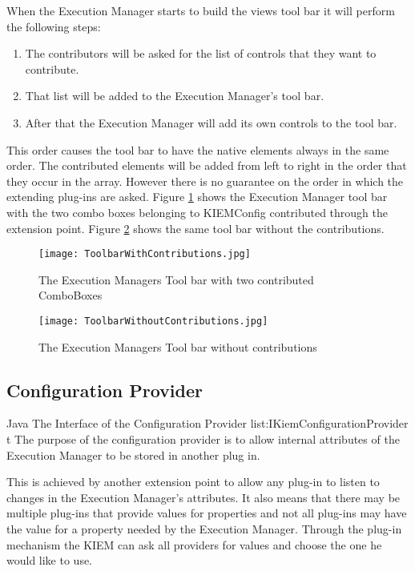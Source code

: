 When the Execution Manager starts to build the views tool bar it will perform the following steps:
\begin{enumerate}
 \item The contributors will be asked for the list of controls that they want to contribute.
 \item That list will be added to the Execution Manager's tool bar.
 \item After that the Execution Manager will add its own controls to the tool bar.
\end{enumerate}
This order causes the tool bar to have the native elements always in the same order.
The contributed elements will be added from left to right in the order that they occur in the array. However there
is no guarantee on the order in which the extending plug-ins are asked.
Figure \ref{fig:ToolbarWithContributions} shows the Execution Manager tool bar with the two combo boxes belonging to \ac{KIEMConfig}
contributed through the extension point. Figure \ref{fig:ToolbarWithoutContributions} shows the same tool bar without
the contributions.
\begin{figure}[H]
  \centering
  \texttt{[image: ToolbarWithContributions.jpg]}
  \caption[The Execution Managers Tool bar with two contributed ComboBoxes]%
  {The Execution Managers Tool bar with two contributed ComboBoxes\protect}
  \label{fig:ToolbarWithContributions}
\end{figure}
\begin{figure}[H]
  \centering
  \texttt{[image: ToolbarWithoutContributions.jpg]}
  \caption[The Execution Managers Tool bar without contributions]%
  {The Execution Managers Tool bar without contributions\protect}
  \label{fig:ToolbarWithoutContributions}
\end{figure}

\subsection{Configuration Provider}
\label{section:ConfigurationProvider}
\listingjava
{}
{Java}
{The Interface of the Configuration Provider}
{list:IKiemConfigurationProvider}
{t}
The purpose of the configuration provider is to allow internal attributes of the
Execution Manager to be stored in another plug in. 

This is achieved by another extension point to allow any plug-in to listen to changes
in the Execution Manager's attributes. It also means that there may be multiple
plug-ins that provide values for properties and not all plug-ins may have the value for
a property needed by the Execution Manager. Through the plug-in mechanism the \ac{KIEM}
can ask all providers for values and choose the one he would like to use.

